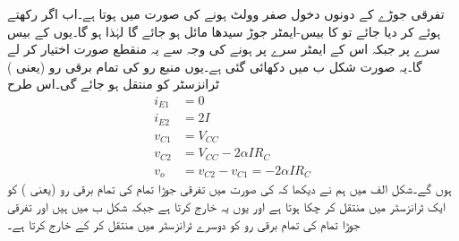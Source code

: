 تفرقی جوڑے کے دونوں دخول صفر وولٹ ہونے کی صورت میں  ہوتا ہے۔اب اگر  رکھتے ہوئے   کر دیا جائے تو  کا بیس-ایمٹر جوڑ سیدھا مائل ہو جائے گا لہٰذا  ہو گا۔یوں  کے بیس  سرے پر  جبکہ اس کے ایمٹر سرے پر  ہونے کی وجہ سے یہ منقطع صورت اختیار کر لے گا۔یہ صورت شکل  ب میں دکھائی گئی ہے۔یوں منبع رو کی تمام برقی رو (یعنی  ) ٹرانزسٹر  کو منتقل ہو جائے گی۔اس طرح
\begin{align*}
i_{E1}&=0\\
i_{E2}&=2 I\\
v_{C1}&=V_{CC}\\
v_{C2}&=V_{CC}-2 \alpha I R_C\\
v_o&=v_{C2}-v_{C1}=-2 \alpha I R_C
\end{align*}
ہوں گے۔شکل  الف میں ہم نے دیکھا کہ  کی صورت میں تفرقی جوڑا تمام کی تمام برقی رو (یعنی ) کو ایک ٹرانزسٹر میں منتقل کر چکا ہوتا ہے اور یوں یہ   خارج کرتا ہے جبکہ شکل  ب میں  ہیں اور تفرقی جوڑا تمام کی تمام برقی رو کو دوسرے ٹرانزسٹر میں منتقل کر کے   خارج کرتا ہے۔

